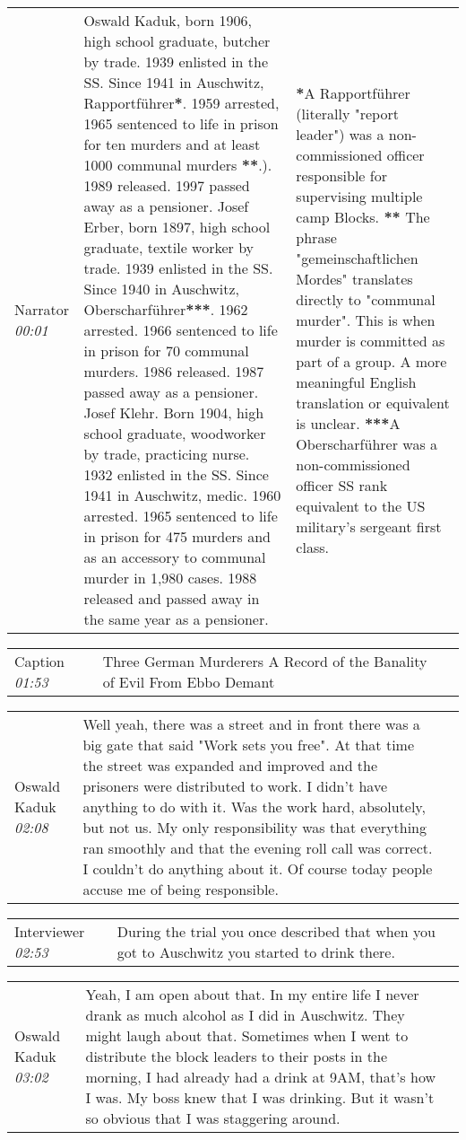 \documentclass{article}
\newcommand{\I}{Interviewer}
\newcommand{\N}{Narrator}
\newcommand{\OK}{Oswald Kaduk}
\newcommand{\dialogueentry}[4]{
    \begin{center}
    \begin{tabular}{p{1in} p{3.5in} p{1.5in}} 
        #2 \newline \textit{#1} & #3 & \small{#4} 
    \end{tabular}
    \end{center}
}
\newcommand{\seenote}[1]{\textbf{#1}}
\newcommand{\onelinebreak}{\newline}
\newcommand{\twolinebreak}{\newline \newline}
\newcommand{\titlepartone}{Three German Murderers}
\newcommand{\titleparttwo}{A Record of the Banality of Evil}
\begin{document}
\dialogueentry{00:01}{\N}{Oswald Kaduk, born 1906, high school graduate, butcher by trade. 1939 enlisted in the SS. Since 1941 in Auschwitz, Rapportführer\seenote{*}. 1959 arrested, 1965 sentenced to life in prison for ten murders and at least 1000 communal murders \seenote{**}.). 1989 released. 1997 passed away as a pensioner.
\twolinebreak
Josef Erber, born 1897,  high school graduate, textile worker by trade. 1939 enlisted in the SS. Since 1940 in Auschwitz, Oberscharführer\seenote{***}. 1962 arrested. 1966 sentenced to life in prison for 70 communal murders. 1986 released. 1987 passed away as a pensioner.
\twolinebreak
Josef Klehr. Born 1904,  high school graduate, woodworker by trade, practicing nurse. 1932 enlisted in the SS. Since 1941 in Auschwitz, medic. 1960 arrested. 1965 sentenced to life in prison for 475 murders and as an accessory to communal murder in 1,980 cases. 1988 released and passed away in the same year as a pensioner.}{
\seenote{*}A Rapportführer (literally "report leader") was a non-commissioned officer responsible for supervising multiple camp Blocks.
\onelinebreak
\seenote{**} The phrase "gemeinschaftlichen Mordes" translates directly to "communal murder". This is when murder is committed as part of a group. A more meaningful English translation or equivalent is unclear. 
\onelinebreak
\seenote{***}A Oberscharführer was a non-commissioned officer SS rank equivalent to the US military's sergeant first class.
}

\dialogueentry{01:53}{Caption}{\titlepartone
\twolinebreak
\titleparttwo
\twolinebreak
From Ebbo Demant}{}

\dialogueentry{02:08}{\OK}{Well yeah, there was a street and in front there was a big gate that said "Work sets you free". At that time the street was expanded and improved and the prisoners were distributed to work. 
\twolinebreak 
I didn't have anything to do with it. Was the work hard, absolutely, but not us. My only responsibility was that everything ran smoothly and that the evening roll call was correct. I couldn't do anything about it. Of course today people accuse me of being responsible.}{}

\dialogueentry{02:53}{\I}{During the trial you once described that when you got to Auschwitz you started to drink there.}{}

\dialogueentry{03:02}{\OK}{Yeah, I am open about that. In my entire life I never drank as much alcohol as I did in Auschwitz. They might laugh about that. Sometimes when I went to distribute the block leaders to their posts in the morning, I had already had a drink at 9AM, that's how I was. My boss knew that I was drinking. But it wasn't so obvious that I was staggering around.}{}
\end{document}
